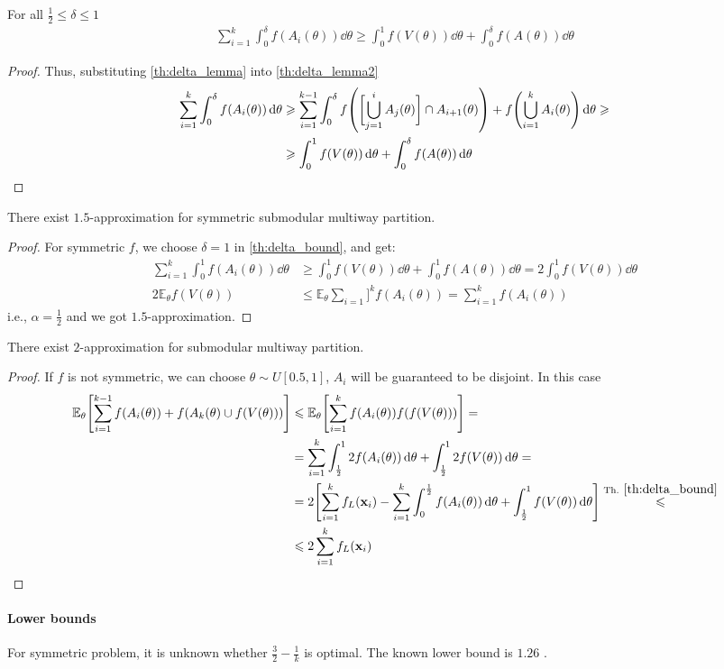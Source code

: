 \begin{theorem} \label{th:delta_bound}
	For all $\frac{1}{2} \leqslant \delta \leqslant 1$
	\begin{align}
	\sum_{i=1}^k \int_0^\delta f(A_i(\theta)) \dd{\theta} \geqslant \int_0^1 f(V(\theta)) \dd{\theta} + \int_0^\delta f(A(\theta))\dd{\theta}
	\end{align}
	\begin{proof}
		Thus, substituting \vref{th:delta_lemma} into \vref{th:delta_lemma2}
		\begin{align}
		\sum_{i=1}^k \int_0^\delta f(A_i(\theta)) \dd{\theta} &\geqslant \sum_{i=1}^{k-1} \int_0^\delta f\qty(\qty\bigg[ \bigcup_{j=1}^{i} A_j(\theta)] \cap A_{i+1}(\theta))  +  f\qty(\bigcup_{i=1}^k A_i(\theta) )\dd{\theta}  \geqslant\\&\geqslant \int_0^1 f(V(\theta)) \dd{\theta} + \int_0^\delta f\qty(A(\theta) ) \dd{\theta}
		\end{align}
	\end{proof}
\end{theorem}
\begin{theorem}
	There exist $1.5$-approximation for symmetric submodular multiway partition.
	\begin{proof}
	For symmetric $f$, we choose $\delta = 1$ in \cref{th:delta_bound}, and get:
	\begin{align}
	\sum_{i=1}^k \int_0^1 f(A_i(\theta)) \dd{\theta} &\geqslant \int_0^1 f(V(\theta)) \dd{\theta} + \int_0^1 f(A(\theta))\dd{\theta} = 2\int_0^1 f(V(\theta)) \dd{\theta}\\ 
	2\mathbb{E}_\theta f(V(\theta)) &\leqslant  \mathbb{E}_\theta  \sum_{i=1}]^k  f(A_i(\theta)) =  \sum_{i=1}^{k} f(A_i(\theta))  
	\end{align}
	i.e., $\alpha = \frac{1}{2}$ and we got $1.5$-approximation.
	\end{proof}
\end{theorem}

\begin{theorem}
	There exist $2$-approximation for submodular multiway partition.
		\begin{proof}
If $f$ is not symmetric, we can choose $\theta\sim U[0.5,1]$, $A_i$ will be guaranteed to be disjoint. In this case
\begin{align}
\mathbb{E}_\theta \qty[\sum_{i=1}^{k-1} f(A_i(\theta)) + f(A_k(\theta) \cup f(V(\theta))) ] &\leqslant\mathbb{E}_\theta \qty[\sum_{i=1}^{k} f(A_i(\theta))  f(f(V(\theta))) ] =\\&= \sum_{i=1}^k \int_{\frac{1}{2}}^{1} 2 f(A_i(\theta))\dd{\theta} + \int_{\frac{1}{2}}^{1} 2 f(V(\theta)) \dd{\theta}  =\\&=
 2\qty[\sum_{i=1}^k f_L(\vb{x}_i) - \sum_{i=1}^k \int_0^{\frac{1}{2}}  f(A_i(\theta))\dd{\theta} + \int_{\frac{1}{2}}^{1}  f(V(\theta)) \dd{\theta}] \stackrel{\text{Th. }\ref{th:delta_bound}}{\leqslant}\\&\leqslant 2 \sum_{i=1}^k f_L(\vb{x}_i)
\end{align}	\end{proof}
\end{theorem}

\paragraph{Lower bounds} For symmetric problem, it is unknown whether $\frac{3}{2} - \frac{1}{k}$ is optimal. The known lower bound is $1.26$ \cite{ene2013local}.

